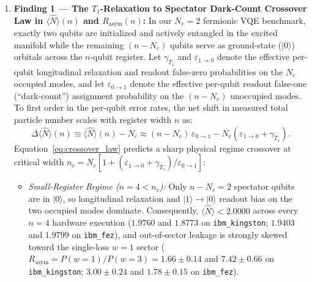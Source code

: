 \documentclass[aps,pra,reprint,superscriptaddress,floatfix,nofootinbib]{revtex4-2}
\begin{document}
\begin{enumerate}
    \item \textbf{Finding 1 --- The $T_1$-Relaxation to Spectator Dark-Count Crossover Law in $\langle \hat{N} \rangle(n)$ and $R_{\text{asym}}(n)$:}
    In our $N_e = 2$ fermionic VQE benchmark, exactly two qubits are initialized and actively entangled in the excited manifold while the remaining $(n - N_e)$ qubits serve as ground-state ($|0\rangle$) orbitals across the $n$-qubit register. Let $\gamma_{T_1}$ and $\varepsilon_{1\to 0}$ denote the effective per-qubit longitudinal relaxation and readout false-zero probabilities on the $N_e$ occupied modes, and let $\varepsilon_{0\to 1}$ denote the effective per-qubit readout false-one (``dark-count'') assignment probability on the $(n - N_e)$ unoccupied modes. To first order in the per-qubit error rates, the net shift in measured total particle number scales with register width $n$ as:
    \begin{equation}
    \Delta \langle \hat{N} \rangle(n) \equiv \langle \hat{N} \rangle(n) - N_e \approx (n - N_e)\,\varepsilon_{0\to 1} - N_e\left(\varepsilon_{1\to 0} + \gamma_{T_1}\right).
    \label{eq:crossover_law}
    \end{equation}
    Equation~\eqref{eq:crossover_law} predicts a sharp physical regime crossover at critical width $n_c = N_e \left[ 1 + (\varepsilon_{1\to 0} + \gamma_{T_1})/\varepsilon_{0\to 1} \right]$:
    \begin{itemize}
        \item \emph{Small-Register Regime ($n = 4 < n_c$):} Only $n - N_e = 2$ spectator qubits are in $|0\rangle$, so longitudinal relaxation and $|1\rangle \to |0\rangle$ readout bias on the two occupied modes dominate. Consequently, $\langle \hat{N} \rangle < 2.0000$ across every $n = 4$ hardware execution ($1.9760$ and $1.8773$ on \texttt{ibm\_kingston}; $1.9403$ and $1.9799$ on \texttt{ibm\_fez}), and out-of-sector leakage is strongly skewed toward the single-loss $w = 1$ sector ($R_{\text{asym}} = P(w=1)/P(w=3) = 1.66 \pm 0.14$ and $7.42 \pm 0.66$ on \texttt{ibm\_kingston}; $3.00 \pm 0.24$ and $1.78 \pm 0.15$ on \texttt{ibm\_fez}).

\end{itemize}
\end{enumerate}
\end{document}
